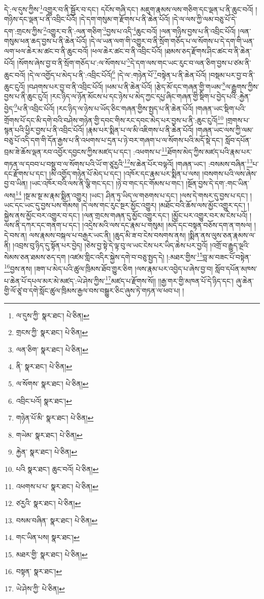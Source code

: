 དེ་:ལ་དུས་ཀྱིས་\footnote{ལ་དུས་ཀྱི་  སྣར་ཐང་།  པེ་ཅིན། }འགྱུར་བ་ནི་སྦྱོར་བ་དང་། དངོས་གཞི་དང་། མཇུག་རྣམས་ལས་གཅིག་དང་ལྡན་པ་ནི་ཆུང་བའོ། །གཉིས་དང་ལྡན་པ་ནི་འབྲིང་པོའོ། །དེ་དག་གསུམ་ག་རྫོགས་པ་ནི་ཆེན་པོའོ། །དེ་ལ་ལས་ཀྱི་ལམ་བཅུ་པོ་དེ་དག་:གྲངས་ཀྱིས་\footnote{གྲངས་ཀྱི་  སྣར་ཐང་།  པེ་ཅིན། }འགྱུར་བ་ནི་:ལན་གཅིག་\footnote{ལན་ཅིག་  སྣར་ཐང་།  པེ་ཅིན། }བྱས་པ་འདི་\footnote{ནི་  སྣར་ཐང་།  པེ་ཅིན། }ཆུང་བའོ། །ལན་གཉིས་བྱས་པ་ནི་འབྲིང་པོའོ། །ལན་གསུམ་ཕན་ཆད་བྱས་པ་ནི་ཆེན་པོའོ། །དེ་ལ་ཡན་ལག་གི་འགྱུར་བ་ནི་སྲོག་གཅོད་པ་ལ་སོགས་པ་དེ་དག་གི་ཡན་ལག་ཕལ་ཆེར་མ་ཚང་བ་ནི་ཆུང་བའོ། །ཕལ་ཆེར་ཚང་བ་ནི་འབྲིང་པོའོ། །ཐམས་ཅད་རྫོགས་ཤིང་ཚང་བ་ནི་ཆེན་པོའོ། །སོགས་ཞེས་བྱ་བ་ནི་སྲོག་གཅོད་པ་:ལ་སོགས་པ་\footnote{ལ་སོགས་  སྣར་ཐང་།  པེ་ཅིན། }དེ་དག་ལས་གང་ཡང་རུང་བ་ལན་ཅིག་བྱས་པ་ཙམ་ནི་ཆུང་བའོ། །དེ་ལ་འགྱོད་པ་མེད་པ་ནི་:འབྲིང་པོའོ།\footnote{འབྲིང་པའོ།  སྣར་ཐང་། } །དེ་ལ་:གཉེན་པོ་\footnote{གཉེན་པོ་མི་  སྣར་ཐང་།  པེ་ཅིན། }བསྟེན་པ་ནི་ཆེན་པོའོ། །བསྡམ་པར་བྱ་བ་ནི་ཆུང་ངུའོ། །བཤགས་པར་བྱ་བ་ནི་འབྲིང་པོའོ། །ཕམ་པ་ནི་ཆེན་པོའོ། །རྩེད་མོ་དང་གཞན་གྱི་གཡམ་\footnote{གཡེམ་  སྣར་ཐང་།  པེ་ཅིན། }ལ་རྒྱུགས་ཀྱིས་བྱས་པ་ནི་ཆུང་ངུའོ། །རང་ཉིད་ལ་ཉོན་མོངས་པ་དང་ཉེས་པ་མེད་ཀྱང་དཔྱ་ཞིང་གཞན་གྱི་སྡིག་པ་བྱེད་པའི་:རྐྱེན་བྱེད་\footnote{རྐྱེན་  སྣར་ཐང་།  པེ་ཅིན། }པ་ནི་འབྲིང་པོའོ། །རང་ཉིད་ལ་ཉེས་པ་ཡོད་ཅིང་གཞན་གྱིས་སྤྱད་པ་ནི་ཆེན་པོའོ། །གཞན་ཡང་སྡིག་པའི་གྲོགས་པོ་དང་མི་དགེ་བའི་བཤེས་གཉེན་གྱི་དབང་གིས་རང་དབང་མེད་པར་བྱས་པ་ནི་:ཆུང་ངུའོ།\footnote{པའི  སྣར་ཐང་། ཆུང་བའོ།  པེ་ཅིན། } །གྲགས་པ་སྙན་པའི་ཕྱིར་བྱས་པ་ནི་འབྲིང་པོའོ། །རྣམ་པར་སྨིན་པ་ལ་མི་འཇིགས་པ་ནི་ཆེན་པོའོ། །གཞན་ཡང་ལས་ཀྱི་ལམ་བཅུ་པོ་འདི་དག་གི་དོན་རྒྱས་པ་ནི་འཕགས་པ་དྲན་པ་ཉེ་བར་གཞག་པ་ལ་སོགས་པའི་མདོ་སྡེ་དང་། སློབ་དཔོན་བྲམ་ཟེ་ཆོས་ལྡན་རབ་འབྱོར་དབྱངས་ཀྱིས་མཛད་པ་དང་། :འཕགས་པ་\footnote{འཕགས་པ་པ་  སྣར་ཐང་།  པེ་ཅིན། }ཐོགས་མེད་ཀྱིས་མཛད་པའི་རྣམ་པར་གཏན་ལ་དབབ་པ་བསྡུ་བ་ལ་སོགས་པའི་ཡོ་ག་ཙཱརྱའི་\footnote{ཙརྱའི་  སྣར་ཐང་།  པེ་ཅིན། }ས་ཆེན་པོར་བལྟའོ། །གཞན་ཡང་། :བསམས་བཞིན་\footnote{བསམ་བཞིན་  སྣར་ཐང་།  པེ་ཅིན། }པ་དང་རྫོགས་པ་དང་། །མི་འགྱོད་གཉེན་པོ་མེད་པ་དང་། །འཁོར་དང་རྣམ་པར་སྨིན་པ་ལས། །བསགས་པའི་ལས་ཞེས་བྱ་བ་ཡིན། །ཡང་འཁོར་བའི་ལས་ནི་ལྕི་གང་དང་། །ཉེ་བ་གང་དང་གོམས་པ་གང་། །སྔོན་བྱས་དེ་དག་:གང་ཡིན་ལས།\footnote{གང་ཡིན་པས།  སྣར་ཐང་། } །སྔ་མ་སྔ་མ་རྣམ་སྨིན་འགྱུར། །ཡང་། ཤིན་ཏུ་ཡིད་ལ་གཅགས་པ་དང་། །ལས་དེ་གསར་དུ་བྱས་པ་དང་། །ཡང་དང་ཡང་དུ་བྱས་པས་གོམས། །དེ་ལས་གང་རུང་སྔར་མྱོང་འགྱུར། །མཐོང་བའི་ཆོས་ལས་མྱོང་འགྱུར་དང་། །སྐྱེས་ནས་མྱོང་བར་འགྱུར་བ་དང་། །ལན་གྲངས་གཞན་དུ་མྱོང་འགྱུར་དང་། །མྱོང་པར་འགྱུར་བར་མ་ངེས་པའོ། །ལས་ནི་དཀར་དང་གནག་པ་དང་། །འདྲེས་མའི་ལས་དང་རྣམ་པ་གསུམ། །མདོ་དང་བསྟན་བཅོས་དག་ན་གསལ། །དེ་བས་ན། ལས་རྣམས་བསྐལ་པ་བརྒྱར་ཡང་ནི། །ཆུད་མི་ཟ་བ་ངེས་བསགས་ནས། །སྨིན་ནས་ལུས་ཅན་རྣམས་ལ་ནི། །འབྲས་བུ་ཉིད་དུ་སྟོན་པར་བྱེད། །ཅེས་བྱ་སྟེ་དེ་ལྟ་བུ་ལ་ཡང་ངེས་པར་ཡིད་ཆེས་པར་བྱའོ། །འགྲོ་བ་རྒྱུད་ལྔའི་སེམས་ཅན་ཐམས་ཅད་དག །འཛམ་གླིང་འདིར་སྐྱེས་དགེ་བ་བཅུ་སྤྱད་དེ། །:མཐར་གྱིས་\footnote{མཐར་གྱི་  སྣར་ཐང་།  པེ་ཅིན། }བླ་མ་བཟང་པོ་བསྟེན་\footnote{བསྟན་  སྣར་ཐང་། }བྱས་ནས། །ཟག་པ་མེད་པའི་ཚུལ་ཁྲིམས་ཐོབ་གྱུར་ཅིག །ལས་རྣམ་པར་འབྱེད་པ་ཞེས་བྱ་བ། སློབ་དཔོན་མཁས་པ་ཆེན་པོ་དཔལ་མར་མེ་མཛད་:ཡེ་ཤེས་ཀྱིས་\footnote{ཡེ་ཤེས་ཀྱི་  པེ་ཅིན། }མཛད་པ་རྫོགས་སོ།། །།རྒྱ་གར་གྱི་མཁན་པོ་དེ་ཉིད་དང་། ཞུ་ཆེན་གྱི་ལོ་ཙཱ་བ་དགེ་སློང་ཚུལ་ཁྲིམས་རྒྱལ་བས་བསྒྱུར་ཅིང་ཞུས་ཏེ་གཏན་ལ་ཕབ་པ། ། 